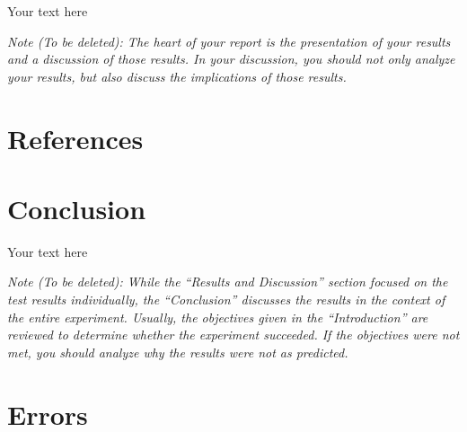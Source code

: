 \documentclass[10pt]{article}
\begin{document}
Your text here

\medskip

\textit{Note (To be deleted): The heart of your report is the presentation of your results and a discussion of those results. In your discussion, you should not only analyze your results, but also discuss the implications of those results.}

\section{References}

\medskip

\section{Conclusion}

Your text here

\medskip

\textit{Note (To be deleted): While the ``Results and Discussion'' section focused on the test results individually, the ``Conclusion'' discusses the results in the context of the entire experiment. Usually, the objectives given in the ``Introduction'' are reviewed to determine whether the experiment succeeded. If the objectives were not met, you should analyze why the results were not as predicted.}

\section{Errors}
 
\end{document}
